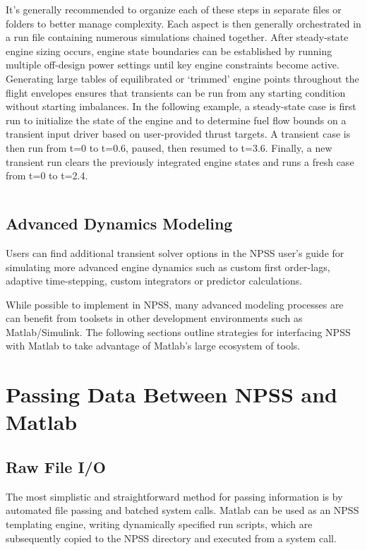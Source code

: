 \documentclass[heading.tex]{subfiles}
\begin{document}
It's generally recommended to organize each of these steps in separate files or folders to better manage complexity.
Each aspect is then generally orchestrated in a run file containing numerous simulations chained together. 
After steady-state engine sizing occurs, engine state boundaries can be established by running multiple
off-design power settings until key engine constraints become active. Generating large tables of equilibrated or `trimmed' engine points
throughout the flight envelopes ensures that transients can be run from any starting condition without
starting imbalances.
In the following example, a steady-state case is first run to initialize the state of the engine and
to determine fuel flow bounds on a transient input driver based on user-provided thrust targets.
A transient case is then run from t=0 to t=0.6, paused, then resumed to t=3.6.
Finally, a new transient run clears the previously integrated engine states and runs a fresh case from t=0 to t=2.4.

 \begin{adjustwidth}{1cm}{-1cm}
 \inputminted[]{c++}{code/transientRun}
 \end{adjustwidth} 

\subsection{Advanced Dynamics Modeling}

Users can find additional transient solver options in the NPSS user's guide \cite[chap.~18]{NPSS} for simulating
more advanced engine dynamics such as custom first order-lags, adaptive time-stepping, custom integrators or
predictor calculations.

While possible to implement in NPSS, many advanced modeling processes are can benefit
from toolsets in other development environments such as Matlab/Simulink.
The following sections outline strategies for interfacing NPSS with Matlab to take advantage of Matlab's large
ecosystem of tools.

\section{Passing Data Between NPSS and Matlab}
\subsection{Raw File I/O}

The most simplistic and straightforward method for passing information is by automated file passing and batched system calls.
Matlab can be used as an NPSS templating engine, writing dynamically specified run scripts, which are subsequently
copied to the NPSS directory and executed from a system call.
\end{document}
